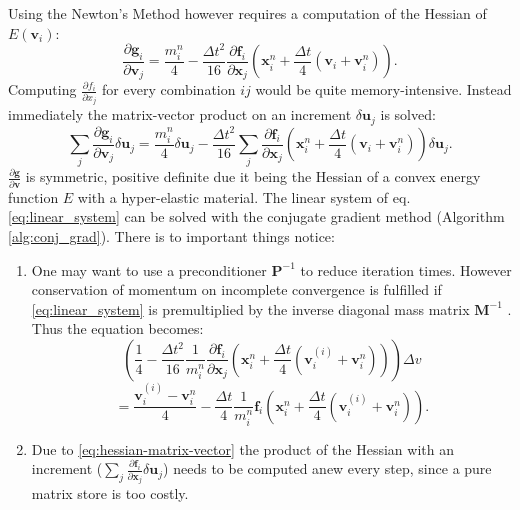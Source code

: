 \documentclass[m,times]{cgMA}
\begin{document}
Using the Newton's Method however requires a computation of the Hessian of $E(\boldsymbol{v}_i)$:
\begin{equation}
  \frac{\partial \boldsymbol{g}_i}{\partial \boldsymbol{v}_j} = \frac{m_i^n}{4} - \frac{\Delta t^2}{16}\frac{\partial \boldsymbol{f}_i}{\partial \boldsymbol{x}_j}\left(\boldsymbol{x}_i^n + \frac{\Delta t}{4} (\boldsymbol{v}_i + \boldsymbol{v}_i^{n})\right).
\end{equation}
Computing $\frac{\partial f_i}{\partial x_j}$ for every combination $ij$ would be quite memory-intensive. Instead immediately the matrix-vector product on an increment $\delta \boldsymbol{u}_j$ is solved:
\begin{equation}\label{eq:hessian-matrix-vector}
  \sum_j\frac{\partial \boldsymbol{g}_i}{\partial \boldsymbol{v}_j}\delta \boldsymbol{u}_j = \frac{m_i^n}{4}\delta \boldsymbol{u}_j - \frac{\Delta t^2}{16}\sum_j \frac{\partial \boldsymbol{f}_i}{\partial \boldsymbol{x}_j}\left(\boldsymbol{x}_i^n + \frac{\Delta t}{4} (\boldsymbol{v}_i + \boldsymbol{v}_i^{n})\right) \delta \boldsymbol{u}_j.
\end{equation}
$\frac{\partial \boldsymbol{g}}{\partial \boldsymbol{v}}$ is symmetric, positive definite due it being the Hessian of a convex energy function $E$ with a hyper-elastic material.
The linear system of eq. \ref{eq:linear_system} can be solved with the conjugate gradient method (Algorithm \ref{alg:conj_grad}). There is to important things notice:
\begin{enumerate}
  \item  One may want to use a preconditioner $\boldsymbol{P}^{-1}$ to reduce iteration times. However conservation of momentum on incomplete convergence is fulfilled if \ref{eq:linear_system} is premultiplied by the inverse diagonal mass matrix $\boldsymbol{M}^{-1}$ \cite{MPM:APIC}. Thus the equation becomes:
    $$
      \left(\frac{1}{4} - \frac{\Delta t^2}{16}\frac{1}{m_i^n}\frac{\partial \boldsymbol{f}_i}{\partial \boldsymbol{x}_j}\left(\boldsymbol{x}_i^n + \frac{\Delta t}{4} (\boldsymbol{v}^{(i)}_i + \boldsymbol{v}_i^{n})\right)\right) \Delta v
      $$
    \begin{equation}
      = \frac{\boldsymbol{v}_i^{(i)}-\boldsymbol{v}_i^n}{4} -\frac{\Delta t}{4}\frac{1}{m_i^n}\boldsymbol{f}_i\left(\boldsymbol{x}_i^n + \frac{\Delta t}{4} (\boldsymbol{v}^{(i)}_i + \boldsymbol{v}_i^{n})\right).
    \end{equation}
  \item Due to \ref{eq:hessian-matrix-vector} the product of the Hessian with an increment ($\sum_j \frac{\partial \boldsymbol{f}_i}{\partial \boldsymbol{x}_j} \delta \boldsymbol{u}_j$) needs to be computed anew every step, since a pure matrix store is too costly.
\end{enumerate}
\end{document}
